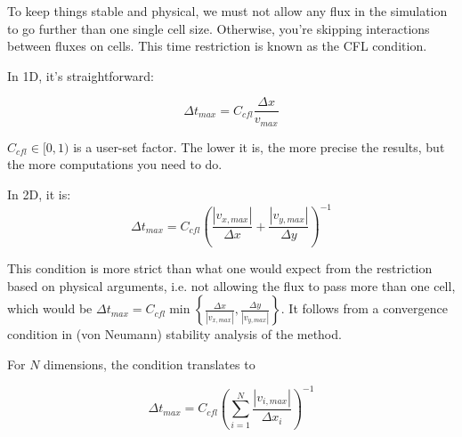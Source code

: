 To keep things stable and physical, we must not allow any flux in the simulation to go further than one single cell size.
Otherwise, you're skipping interactions between fluxes on cells.
This time restriction is known as the CFL condition.

In 1D, it's straightforward:

\begin{equation}
	\Delta t_{max} = C_{cfl} \frac{\Delta x}{v_{max}} \label{eq:CFL1D}
\end{equation}

$C_{cfl} \in [0, 1) $ is a user-set factor.
The lower it is, the more precise the results, but the more computations you need to do.

In 2D, it is:
\begin{equation}
	\Delta t_{max} = C_{cfl} \left( \frac{|v_{x,max}|}{\Delta x} +  \frac{|v_{y,max}|}{\Delta y} \right)^{-1} \label{eq:CFL2D}
\end{equation}

This condition is more strict than what one would expect from the restriction based on physical arguments, i.e. not allowing the flux to pass more than one cell, which would be $\Delta t_{max} = C_{cfl} \min \left\{ \frac{\Delta x}{|v_{x,max}|} ,  \frac{\Delta y}{|v_{y,max}|} \right\} $.
It follows from a convergence condition in (von Neumann) stability analysis of the method.

For $N$ dimensions, the condition translates to

\begin{equation}
	\Delta t_{max} = C_{cfl} \left( \sum_{i=1}^{N} \frac{|v_{i,max}|}{\Delta x_i} \right)^{-1}  \label{eq:CFLND}
\end{equation}